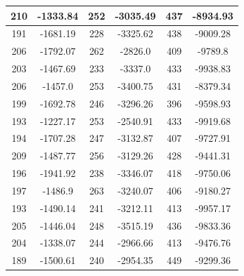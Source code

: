 \documentclass{article}
\begin{document}
\begin{tabular}{cccccc}
210&-1333.84&252&-3035.49&437&-8934.93 \\ \hline
191&-1681.19&228&-3325.62&438&-9009.28 \\ \hline
206&-1792.07&262&-2826.0&409&-9789.8 \\ \hline
203&-1467.69&233&-3337.0&433&-9938.83 \\ \hline
206&-1457.0&253&-3400.75&431&-8379.34 \\ \hline
199&-1692.78&246&-3296.26&396&-9598.93 \\ \hline
193&-1227.17&253&-2540.91&433&-9919.68 \\ \hline
194&-1707.28&247&-3132.87&407&-9727.91 \\ \hline
209&-1487.77&256&-3129.26&428&-9441.31 \\ \hline
196&-1941.92&238&-3346.07&418&-9750.06 \\ \hline
197&-1486.9&263&-3240.07&406&-9180.27 \\ \hline
193&-1490.14&241&-3212.11&413&-9957.17 \\ \hline
205&-1446.04&248&-3515.19&436&-9833.36 \\ \hline
204&-1338.07&244&-2966.66&413&-9476.76 \\ \hline
189&-1500.61&240&-2954.35&449&-9299.36 \\ \hline
\end{tabular}
\end{document}
